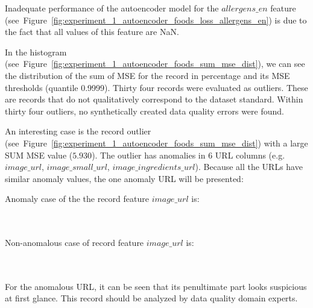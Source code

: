 					Inadequate performance of the autoencoder model for the $allergens\_en$ feature (see~Figure~\ref{fig:experiment_1_autoencoder_foods_loss_allergens_en}) is due to the fact that all values of this feature are NaN. 
					
							
					In the histogram (see~Figure~\ref{fig:experiment_1_autoencoder_foods_sum_mse_dist}), we can see the distribution of the sum of MSE for the record in percentage and its MSE thresholds (quantile 0.9999). Thirty four records were evaluated as outliers. These are records that do not qualitatively correspond to the dataset standard. Within thirty four outliers, no synthetically created data quality errors were found. 
					
					
					An interesting case is the record outlier (see~Figure~\ref{fig:experiment_1_autoencoder_foods_sum_mse_dist}) with a large SUM MSE value ($5.930$). The outlier has anomalies in $6$ URL columns (e.g. $image\_url$, $image\_small\_url$, $image\_ingredients\_url$). Because all the URLs have similar anomaly values, the one anomaly URL will be presented:
										
					Anomaly case of the the record feature $image\_url$ is:\\ \\ \\
					
					Non-anomalous case of record feature $image\_url$ is:\\ \\ \\
					
					For the anomalous URL, it can be seen that its penultimate part looks suspicious at first glance. This record should be analyzed by data quality domain experts.
					
